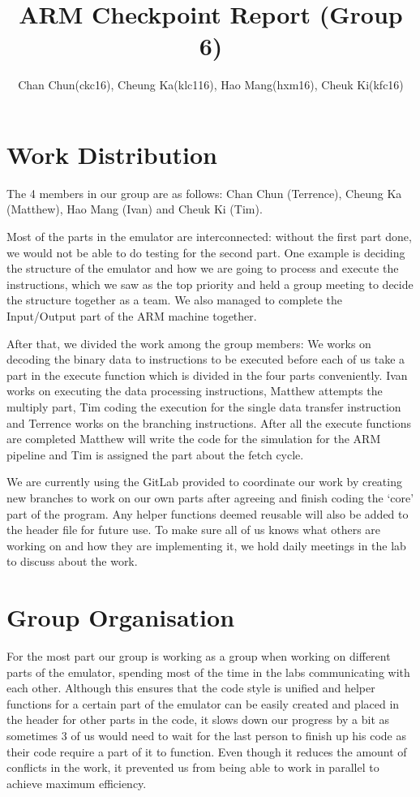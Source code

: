 \documentclass[11pt]{article}
\begin{document}
\title{ARM Checkpoint Report (Group 6) }
\author{Chan Chun(ckc16), Cheung Ka(klc116), Hao Mang(hxm16), Cheuk Ki(kfc16)}

\maketitle

\section{Work Distribution}

The 4 members in our group are as follows: Chan Chun (Terrence), Cheung Ka (Matthew), Hao Mang (Ivan) and Cheuk Ki (Tim).
 
Most of the parts in the emulator are interconnected: without the first part done, we would not be able to do testing for the second part. One example is deciding the structure of the emulator and how we are going to process and execute the instructions, which we saw as the top priority and held a group meeting to decide the structure together as a team. We also managed to complete the Input/Output part of the ARM machine together.
 
After that, we divided the work among the group members: We works on decoding the binary data to instructions to be executed before each of us take a part in the execute function which is divided in the four parts conveniently. Ivan works on executing the data processing instructions, Matthew attempts the multiply part, Tim coding the execution for the single data transfer instruction and Terrence works on the branching instructions. After all the execute functions are completed Matthew will write the code for the simulation for the ARM pipeline and Tim is assigned the part about the fetch cycle.
 
We are currently using the GitLab provided to coordinate our work by creating new branches to work on our own parts after agreeing and finish coding the ‘core’ part of the program. Any helper functions deemed reusable will also be added to the header file for future use. To make sure all of us knows what others are working on and how they are implementing it, we hold daily meetings in the lab to discuss about the work.


\section{Group Organisation}

For the most part our group is working as a group when working on different parts of the emulator, spending most of the time in the labs communicating with each other. Although this ensures that the code style is unified and helper functions for a certain part of the emulator can be easily created and placed in the header for other parts in the code, it slows down our progress by a bit as sometimes 3 of us would need to wait for the last person to finish up his code as their code require a part of it to function. Even though it reduces the amount of conflicts in the work, it prevented us from being able to work in parallel to achieve maximum efficiency. 
 
\end{document}

